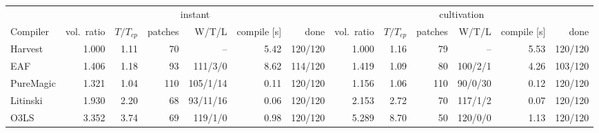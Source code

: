 \begin{tabular}{lrrrrrrrrrrrr}
\toprule
 & \multicolumn{6}{c}{instant} & \multicolumn{6}{c}{cultivation} \\
Compiler & vol.\ ratio & $T/T_{cp}$ & patches & W/T/L & compile [s] & done & vol.\ ratio & $T/T_{cp}$ & patches & W/T/L & compile [s] & done \\
\midrule
Harvest & 1.000 & 1.11 & 70 & -- & 5.42 & 120/120 & 1.000 & 1.16 & 79 & -- & 5.53 & 120/120 \\
EAF & 1.406 & 1.18 & 93 & 111/3/0 & 8.62 & 114/120 & 1.419 & 1.09 & 80 & 100/2/1 & 4.26 & 103/120 \\
PureMagic & 1.321 & 1.04 & 110 & 105/1/14 & 0.11 & 120/120 & 1.156 & 1.06 & 110 & 90/0/30 & 0.12 & 120/120 \\
Litinski & 1.930 & 2.20 & 68 & 93/11/16 & 0.06 & 120/120 & 2.153 & 2.72 & 70 & 117/1/2 & 0.07 & 120/120 \\
O3LS & 3.352 & 3.74 & 69 & 119/1/0 & 0.98 & 120/120 & 5.289 & 8.70 & 50 & 120/0/0 & 1.13 & 120/120 \\
\bottomrule
\end{tabular}
